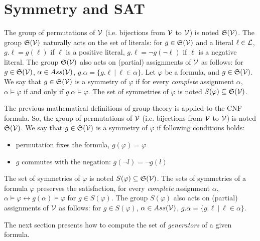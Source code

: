 \chapter{Symmetry and SAT}\label{chap:symmetryinsat}



The group of permutations of $\mathcal{V}$ (i.e. bijections from $\mathcal{V}$ to $\mathcal{V}$) is noted
$\mathfrak{S}(\mathcal{V})$. The group $\mathfrak{S}(\mathcal{V})$ naturally acts on the set of literals: for $g
\in \mathfrak{S}(\mathcal{V})$ and a literal $\ell \in \mathcal{L} $, $g.\ell = g(\ell)$ if $\ell$ is a
positive literal, $g.\ell = \neg g(\neg \ell)$ if $\ell$ is a negative literal.
The group $\mathfrak{S}(\mathcal{V})$ also acts on (partial) assignments of $\mathcal{V}$ as follows: for
$g \in \mathfrak{S}(\mathcal{V})$, $\alpha \in Ass(\mathcal{V})$, $g.\alpha = \{ g.\ell ~|~ \ell \in \alpha \}$. Let $\varphi$ be a formula, and $g \in \mathfrak{S}(\mathcal{V})$. We say that $g\in \mathfrak{S}(\mathcal{V})$ is a
symmetry of $ \varphi$ if for every \emph{complete} assignment $\alpha$, $\alpha
\models \varphi$ if and only if $g.\alpha \models \varphi$. The set of symmetries
of $\varphi$ is noted $S(\varphi) \subseteq \mathfrak{S}(\mathcal{V})$.



The previous mathematical definitions of group theory is applied to the CNF formula.
So, the group of permutations of $\mathcal{V}$ (i.e. bijections from $\mathcal{V}$ to $\mathcal{V}$) is noted
$\mathfrak{S}(\mathcal{V})$. We say that $g\in \mathfrak{S}(\mathcal{V})$ is a symmetry of $ \varphi$ if following conditions holds:
\vspace{-1em}
\begin{itemize}[topsep=1em]
	\item permutation fixes the formula, $g(\varphi) =  \varphi$ 
	\item $g$  commutes with the negation: $g(\neg l)  = \neg g(l)$
\end{itemize}

The set of symmetries of $\varphi$ is noted $S(\varphi) \subseteq \mathfrak{S}(\mathcal{V})$.
The sets of symmetries of a formula $\varphi$ preserves the satisfaction,
for every \emph{complete} assignment $\alpha$, 
$\alpha \models \varphi \leftrightarrow g(\alpha) \models \varphi$ for $g \in S(\varphi)$.
The group $S(\varphi)$ also acts on (partial) assignments of $\mathcal{V}$ as follows: for
$g \in S(\varphi)$, $\alpha \in Ass(\mathcal{V})$, $g.\alpha = \{ g.\ell ~|~ \ell \in \alpha \}$. 


The next section presents how to compute the set of \emph{generators} of a given formula.

